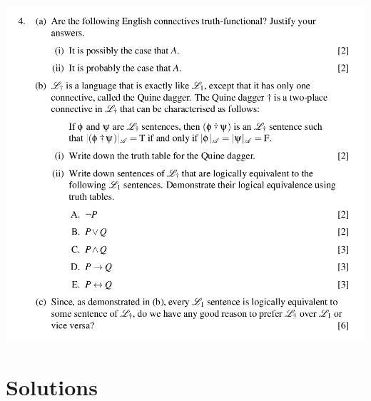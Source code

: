 \documentclass[a4paper, 11pt]{article} %
\theoremstyle{theorem}
\theoremstyle{Pthm}
\begin{document}
\begin{center}
  \includegraphics[width=1\textwidth]{Problem4.png}
\end{center}



\section*{Solutions}























\end{document}

